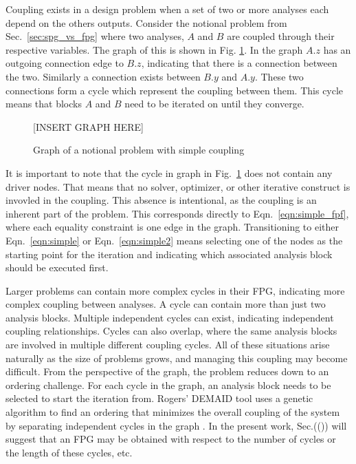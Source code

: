   Coupling exists in a design problem when a set of two or more analyses each depend on the
  others outputs. Consider the notional problem from Sec.~\ref{sec:spg_vs_fpg} where two 
  analyses, $A$ and $B$ are coupled through their respective variables. The graph of this 
  is shown in Fig. \ref{f:coupling}. In the graph $A.z$ has an outgoing connection 
  edge to $B.z$, indicating that there is a connection between the two. 
  Similarly a connection exists between $B.y$ and $A.y$. These two connections form 
  a cycle which represent the coupling between them. This cycle means that blocks $A$ and $B$ need
  to be iterated on until they converge. 

  \begin{figure}
      \begin{center}
      [INSERT GRAPH HERE]
      \caption{Graph of a notional problem with simple coupling \label{f:coupling}}
      \end{center}
  \end{figure}

  It is important to note that the cycle in graph in Fig.~\ref{f:coupling} does not contain 
  any driver nodes. That means that no solver, optimizer, or other iterative construct is 
  invovled in the coupling. This absence is intentional, as the coupling is an inherent part 
  of the problem. This corresponds directly to Eqn.~\ref{eqn:simple_fpf}, where 
  each equality constraint is one edge in the graph. Transitioning to either 
  Eqn.~\ref{eqn:simple} or Eqn.~\ref{eqn:simple2} means selecting one of the nodes as the starting point 
  for the iteration and indicating which associated analysis block should be executed first. 

  Larger problems can contain more complex cycles in their FPG, indicating more 
  complex coupling between analyses. A cycle can contain more than 
  just two analysis blocks. Multiple independent cycles can exist, indicating 
  independent coupling relationships. Cycles can also overlap, where the same analysis 
  blocks are involved in multiple different coupling cycles. All of these situations
  arise naturally as the size of problems grows, and managing this coupling may
  become difficult. From the perspective of the graph, the problem reduces down to 
  an ordering challenge. For each cycle in the graph, an analysis block needs to be selected 
  to start the iteration from. Rogers' DEMAID tool uses a genetic algorithm to find an ordering 
  that minimizes the overall coupling of the system by separating independent 
  cycles in the graph \cite{rogers1996,rogers1996demaid}. In the present work, Sec.(()) will suggest that an FPG may be obtained with respect to the number of cycles or the length of these cycles, etc.


